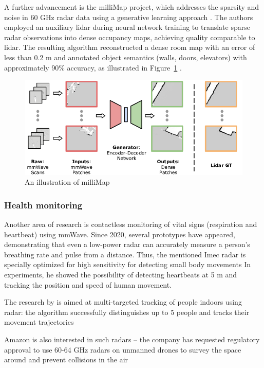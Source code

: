A further advancement is the milliMap project, which addresses the sparsity and noise in 60 GHz radar data using a generative learning approach \citep{Lu2020milliMap}. The authors employed an auxiliary lidar during neural network training to translate sparse radar observations into dense occupancy maps, achieving quality comparable to lidar. The resulting algorithm reconstructed a dense room map with an error of less than 0.2 m and annotated object semantics (walls, doors, elevators) with approximately 90\% accuracy, as illustrated in Figure~\ref{fig:milliMap} \citep{Lu2020milliMap}.

\begin{figure}
    \centering
    \includegraphics[width=0.75\linewidth]{Src/images/An-illustration-of-milliMap-A-neural-network-generator-takes-as-input-the-stitched.png}
    \caption{An illustration of milliMap \citep{lu2020smokerobustindoormapping}{}}
    \label{fig:milliMap}
\end{figure}

\subsubsection{Health monitoring}
Another area of research is contactless monitoring of vital signs (respiration and heartbeat) using mmWave. Since 2020, several prototypes have appeared, demonstrating that even a low-power radar can accurately measure a person's breathing rate and pulse from a distance. Thus, the mentioned Imec radar is specially optimized for high sensitivity for detecting small body movements \citep{imec_60ghz_radar_chip} In experiments, he showed the possibility of detecting heartbeats at 5 m and tracking the position and speed of human movement.


The research by \cite{elghitani2021automotive} is aimed at multi-targeted tracking of people indoors using radar: the algorithm successfully distinguishes up to 5 people and tracks their movement trajectories

Amazon is also interested in such radars – the company has requested regulatory approval to use 60-64 GHz radars on unmanned drones to survey the space around and prevent collisions in the air \citep{fcc_60ghz_policy}

